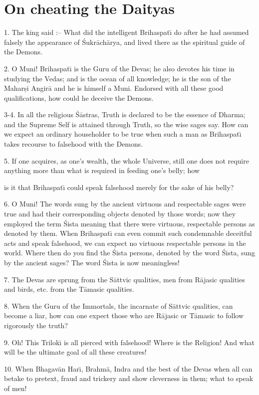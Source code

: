 \chapter{On cheating the Daityas}

1. The king said :-- What did the intelligent Brihaspat\={\i} do after he had assumed falsely the appearance of \'Sukr\=ach\=arya, and lived there as the spiritual guide of the Demons.

2. O Muni! Brihaspat\={\i} is the Guru of the Devas; he also devotes his time in studying the Vedas; and is the ocean of all knowledge; he is the son of the Mahar\d{s}i Angir\=a and he is himself a Muni. Endorsed with all these good qualifications, how could he deceive the Demons.

3-4. In all the religious \'S\=astras, Truth is declared to be the essence of Dharma; and the Supreme Self is attained through Truth, so the wise sages say. How can we expect an ordinary householder to be true when such a man as Brihaspat\={\i} takes recourse to falsehood with the Demons.

5. If one acquires, as one's wealth, the whole Universe, still one does not require anything more than what is required in feeding one's belly; how

is it that Brihaspat\={\i} could speak falsehood merely for the sake of his belly?

6. O Muni! The words sung by the ancient virtuous and respectable sages were true and had their corresponding objects denoted by those words; now they employed the term \'Sista meaning that there were virtuous, respectable persons as denoted by them. When Brihaspat\={\i} can even commit such condemnable deceitful acts and speak falsehood, we can expect no virtuous respectable persons in the world. Where then do you find the \'Sista persons, denoted by the word \'Sista, sung by the ancient sages? The word \'Sista is now meaningless!

7. The Devas are sprung from the S\=attvic qualities, men from R\=ajasic qualities and birds, etc. from the T\=amasic qualities.

8. When the Guru of the Immortals, the incarnate of S\=attvic qualities, can become a liar, how can one expect those who are R\=ajasic or T\=amasic to follow rigorously the truth?

9. Oh! This Trilok\={\i} is all pierced with falsehood! Where is the Religion! And what will be the ultimate goal of all these creatures!

10. When Bhagav\=an Har\={\i}, Brahm\=a, Indra and the best of the Devas when all can betake to pretext, fraud and trickery and show cleverness in them; what to speak of men!

